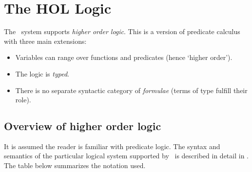 \chapter{The HOL Logic}
\label{HOLlogic}

The \HOL\  system  supports {\it  higher order  logic}.   This is  a version of
predicate calculus with three main extensions:

\begin{itemize}
\item Variables can range over functions and predicates
(hence `higher order').
\item The logic is {\it typed}.
\item There is no separate syntactic category of {\it formulae\/}
(terms of type  fulfill their role).
\end{itemize}

\section{Overview of higher order logic}

It is assumed the reader is familiar with predicate logic.  The syntax
and semantics of the particular logical system supported by \HOL\ is
described in detail in \DESCRIPTION.  The table below summarizes the
notation used.


\bigskip

